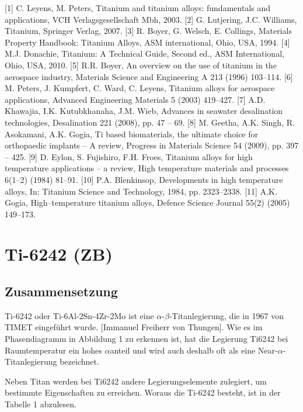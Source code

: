 [1] C. Leyens, M. Peters, Titanium and titanium alloys: fundamentals and applications, VCH Verlagsgesellschaft Mbh, 2003. [2] G. Lutjering, J.C. Williams, Titanium, Springer Verlag, 2007. [3] R. Boyer, G. Welsch, E. Collings, Materials Property Handbook: Titanium Alloys, ASM international, Ohio, USA, 1994. [4] M.J. Donachie, Titanium: A Technical Guide, Second ed., ASM International, Ohio, USA, 2010. [5] R.R. Boyer, An overview on the use of titanium in the aerospace industry, Materials Science and Engineering A 213 (1996) 103–114. [6] M. Peters, J. Kumpfert, C. Ward, C. Leyens, Titanium alloys for aerospace applications, Advanced Engineering Materials 5 (2003) 419–427. [7] A.D. Khawajia, I.K. Kutubkhanaha, J.M. Wieb, Advances in seawater desalination technologies, Desalination 221 (2008), pp. 47 – 69. [8] M. Geetha, A.K. Singh, R. Asokamani, A.K. Gogia, Ti based biomaterials, the ultimate choice for orthopaedic implants – A review, Progress in Materials Science 54 (2009), pp. 397 – 425. [9] D. Eylon, S. Fujishiro, F.H. Froes, Titanium alloys for high temperature applications – a review, High temperature materials and processes 6(1–2) (1984) 81–91. [10] P.A. Blenkinsop, Developments in high temperature alloys, In: Titanium Science and Technology, 1984, pp. 2323–2338. [11] A.K. Gogia, High–temperature titanium alloys, Defence Science Journal 55(2) (2005) 149–173. 


\section{Ti-6242 (ZB)}

\subsection{Zusammensetzung}
Ti-6242 oder Ti-6Al-2Sn-4Zr-2Mo ist eine $\alpha$-$\beta$-Titanlegierung, die  in 1967 von TIMET eingeführt wurde. [Immanuel Freiherr von Thungen]. 
Wie es im Phasendiagramm in Abbildung 1 zu erkennen ist, hat die Legierung Ti6242 bei Raumtemperatur ein hohes $\alpha$anteil und wird auch deshalb oft als eine Near-$\alpha$-Titanlegierung bezeichnet.

Neben Titan werden bei Ti6242 andere Legierungselemente zulegiert, um bestimmte Eigenschaften zu erreichen. Woraus die Ti-6242 besteht, ist in der Tabelle 1 abzulesen.


